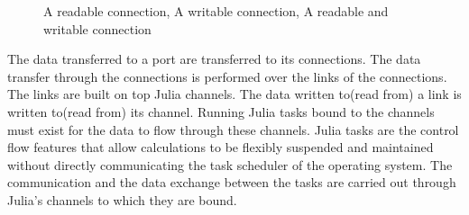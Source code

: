 \begin{figure}
    \centering
     \hfil 
     \hfil 
    \caption{\protect{} A readable connection, \protect{} A writable connection, \protect{} A readable and writable connection}
    \label{fig: tasks}
\end{figure}

The data transferred to a port are transferred to its connections. The data transfer through the connections is performed over the links of the connections. The links are built on top Julia channels. The data written to(read from) a link is written to(read from) its channel. Running Julia tasks bound to the channels must exist for the data to flow through these channels. Julia tasks are the control flow features that allow calculations to be flexibly suspended and maintained without directly communicating the task scheduler of the operating system\cite{julialang}. The communication and the data exchange between the tasks are carried out through Julia's channels to which they are bound.

